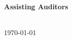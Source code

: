 \begin{titlepage}
\begin{center}
    \vspace{0.2cm}
    \\
    \vspace{1cm}


    \large
    {\bfseries Assisting Auditors}\\

    \vspace{0.2cm}
    \\
    \vspace{1cm}

    \bigbreak
    \vfill
    
    {\normalsize \today}

  \end{center}

\end{titlepage}
